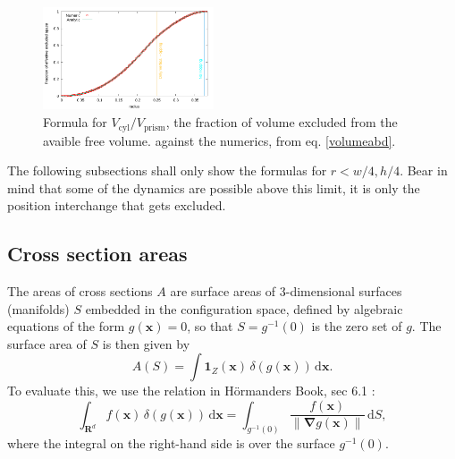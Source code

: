 \documentclass[superscriptaddress,pre,reprint,showpacs,onecolumn]{revtex4-1}
\newcommand{\indicatorsymbol}{\mathbf{1}}
\begin{document}

\begin{figure}[h]
\centering
\includegraphics[width=0.45\textwidth]{./FigurasPerfectas/VolumenExacto01.pdf}
\caption{Formula for $V_\text{cyl}/V_\text{prism}$, the fraction of volume excluded from
  the avaible free volume.
  against the numerics, from eq. \ref{volumeabd}.
}\label{VolMonteC}%
\end{figure}


The following subsections shall only show the formulas for $r<w/4, h/4$.
Bear in mind that some of the dynamics are possible above this limit,
it is only the position interchange that gets excluded. \\



\subsection{Cross section areas}\label{areahop}

The areas of cross sections $A$ are surface areas of 3-dimensional surfaces (manifolds) $S$ embedded in the configuration space,
defined by algebraic equations of the form $g(\mathbf{x}) = 0$, so that $S = g^{-1}(0)$ is the zero set of $g$.
The surface area of $S$ is then given by
\begin{equation}
A(S) = \int \indicatorsymbol_Z(\mathbf{x}) \, \delta(g(\mathbf{x})) \, \mathrm{d} \mathbf{x}.
\label{eq:surface-area}
\end{equation}
To evaluate this, we use the relation in H\"ormanders Book, sec 6.1 \cite{Hormander83}:
\begin{equation}
\int_{\mathbf{R}^d} f(\mathbf{x}) \, \delta(g(\mathbf{x})) \, \mathrm{d} \mathbf{x} = \int_{g^{-1}(0)}\frac{f(\mathbf{x})}{\| \mathbf{\nabla}g(\mathbf{x}) \|} \, \mathrm{d}S,
\label{eq:surface-dirac}
\end{equation}
where the integral on the right-hand side is over the surface $g^{-1}(0)$.
\end{document}
